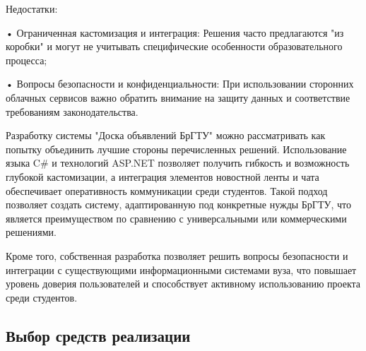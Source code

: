 {	\par \redline Недостатки:
	
	\par \redline • Ограниченная кастомизация и интеграция: Решения часто предлагаются "из коробки" и могут не учитывать специфические особенности образовательного процесса;
	
	\par \redline • Вопросы безопасности и конфиденциальности: При использовании сторонних облачных сервисов важно обратить внимание на защиту данных и соответствие требованиям законодательства. 
	
	\par \redline Разработку системы "Доска объявлений БрГТУ" можно рассматривать как попытку объединить лучшие стороны перечисленных решений. Использование языка C\# и технологий ASP.NET позволяет получить гибкость и возможность глубокой кастомизации, а интеграция элементов новостной ленты и чата обеспечивает оперативность коммуникации среди студентов. Такой подход позволяет создать систему, адаптированную под конкретные нужды БрГТУ, что является преимуществом по сравнению с универсальными или коммерческими решениями.
	
	\par \redline Кроме того, собственная разработка позволяет решить вопросы безопасности и интеграции с существующими информационными системами вуза, что повышает уровень доверия пользователей и способствует активному использованию проекта среди студентов.
	
	\par
}
\subtitlespace

\subsection*{ 
	\gostTitleFont
	 Выбор средств реализации
} 

\subtitlespace

